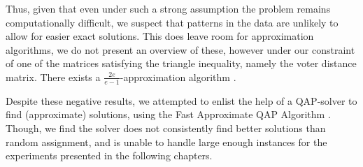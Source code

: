 Thus, given that even under such a strong assumption the problem remains
computationally difficult, we suspect that patterns in the data are unlikely to
allow for easier exact solutions. This does leave room for approximation
algorithms, we do not present an overview of these, however under our
constraint of one of the matrices satisfying the triangle inequality, namely
the voter distance matrix. There exists a $\frac{2e}{e-1}$-approximation
algorithm \cite{nagarajanMaximumQuadraticAssignment2009}.

Despite these negative results, we attempted to enlist the help of a QAP-solver
\cite{virtanenSciPy10Fundamental2020} to find (approximate) solutions, using
the Fast Approximate QAP Algorithm
\cite{vogelsteinFastApproximateQuadratic2015}. Though, we find the solver does
not consistently find better solutions than random assignment, and is unable to
handle large enough instances for the experiments presented in the following
chapters.
